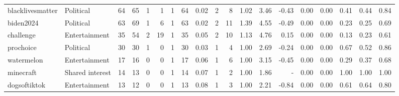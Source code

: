 \begin{tabular}{llrrrrrrrrrrrrrrrrr}
blacklivesmatter &       Political &     64 &     65 &                           1 &                            1 &             1 &                         64 &     0.02 &    2 &      8 & 1.02 &   3.46 &                              -0.43 &   0.00 &         0.00 &                                0.41 &                                   0.44 &                                     0.84 \\
       biden2024 &       Political &     63 &     69 &                           1 &                            6 &             1 &                         63 &     0.02 &    2 &     11 & 1.39 &   4.55 &                              -0.49 &   0.00 &         0.00 &                                0.23 &                                   0.25 &                                     0.69 \\
       challenge &   Entertainment &     35 &     54 &                           2 &                           19 &             1 &                         35 &     0.05 &    2 &     10 & 1.13 &   4.76 &                               0.15 &   0.00 &         0.00 &                                0.13 &                                   0.23 &                                     0.61 \\
       prochoice &       Political &     30 &     30 &                           1 &                            0 &             1 &                         30 &     0.03 &    1 &      4 & 1.00 &   2.69 &                              -0.24 &   0.00 &         0.00 &                                0.67 &                                   0.52 &                                     0.86 \\
      watermelon &   Entertainment &     17 &     16 &                           0 &                            0 &             1 &                         17 &     0.06 &    1 &      6 & 1.00 &   3.15 &                              -0.45 &   0.00 &         0.00 &                                0.29 &                                   0.37 &                                     0.68 \\
       minecraft & Shared interest &     14 &     13 &                           0 &                            0 &             1 &                         14 &     0.07 &    1 &      2 & 1.00 &   1.86 &                                - &   0.00 &         0.00 &                                1.00 &                                   1.00 &                                     1.00 \\
    dogsoftiktok &   Entertainment &     13 &     12 &                           0 &                            0 &             1 &                         13 &     0.08 &    1 &      3 & 1.00 &   2.21 &                              -0.84 &   0.00 &         0.00 &                                0.61 &                                   0.64 &                                     0.80 \\

\end{tabular}
